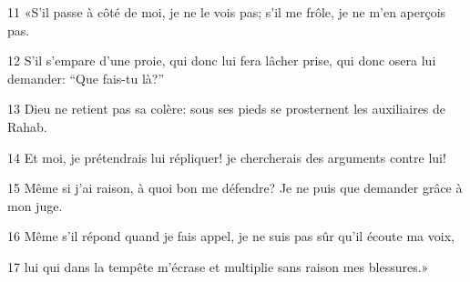 
11 «S’il passe à côté de moi, je ne le vois pas; s’il me frôle, je ne m’en aperçois pas.

12 S’il s’empare d’une proie, qui donc lui fera lâcher prise, qui donc osera lui demander: “Que fais-tu là?”

13 Dieu ne retient pas sa colère: sous ses pieds se prosternent les auxiliaires de Rahab.

14 Et moi, je prétendrais lui répliquer! je chercherais des arguments contre lui!

15 Même si j’ai raison, à quoi bon me défendre? Je ne puis que demander grâce à mon juge.

16 Même s’il répond quand je fais appel, je ne suis pas sûr qu’il écoute ma voix,

17 lui qui dans la tempête m’écrase et multiplie sans raison mes blessures.»